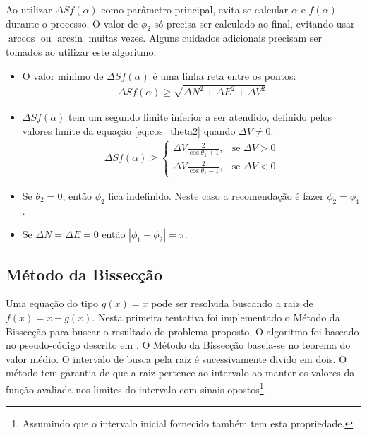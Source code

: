\documentclass[final,3p,12pt]{elsarticle}
\begin{document}
Ao utilizar $\Delta S f(\alpha)$ como parâmetro principal, evita-se calcular $\alpha$ e $f(\alpha)$ durante o processo. O valor de $\phi_2$ só precisa ser calculado ao final, evitando usar $\arccos$ ou $\arcsin$ muitas vezes. Alguns cuidados adicionais precisam ser tomados ao utilizar este algoritmo:

\begin{itemize}
    \item O valor mínimo de $\Delta S f(\alpha)$ é uma linha reta entre os pontos:
    \begin{align*}
        \Delta S f(\alpha) \geq \sqrt{\Delta N^2 + \Delta E^2 + \Delta V^2}
    \end{align*}
    \item $\Delta S f(\alpha)$ tem um segundo limite inferior a ser atendido, definido pelos valores limite da equação \ref{eq:cos_theta2} quando $\Delta V \neq 0$:
    \begin{align*}
        \Delta S f(\alpha) \geq \begin{cases}
            \Delta V \frac{2}{\cos \theta_1+1},&\text{se } \Delta V > 0 \\
            \Delta V \frac{2}{\cos \theta_1-1},&\text{se } \Delta V < 0  
        \end{cases}
    \end{align*}
    \item Se $\theta_2 = 0$, então $\phi_2$ fica indefinido. Neste caso a recomendação é fazer $\phi_2 = \phi_1$. 
    \item Se $\Delta N = \Delta E = 0$ então $|\phi_1 - \phi_2| = \pi$.
\end{itemize}

    \subsection{Método da Bissecção}
    
    Uma equação do tipo $g(x)=x$ pode ser resolvida buscando a raiz de $f(x) = x - g(x)$. Nesta primeira tentativa foi implementado o Método da Bissecção para buscar o resultado do problema proposto. O algoritmo foi baseado no pseudo-código descrito em \cite{burden2016analise}. O Método da Bissecção baseia-se no teorema do valor médio. O intervalo de busca pela raiz é sucessivamente divido em dois. O método tem garantia de que a raiz pertence ao intervalo ao manter os valores da função avaliada nos limites do intervalo com sinais opostos\footnote{Assumindo que o intervalo inicial fornecido também tem esta propriedade.}. 
\end{document}
